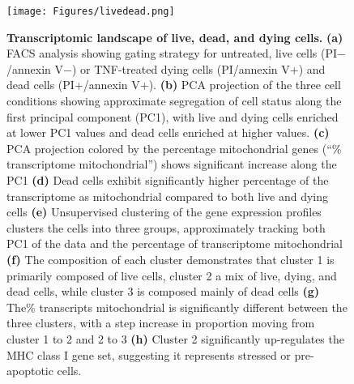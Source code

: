 \begin{figure}
	\centering
	\texttt{[image: Figures/livedead.png]}
	\caption[Transcriptomic landscape of live, dead, and dying cells.]
	{\small
	    \textbf{Transcriptomic landscape of live, dead, and dying cells.}
	    \textbf{(a)} FACS analysis showing gating strategy for untreated, live cells (PI$-$/annexin V$-$) or TNF\textalpha-treated dying cells (PI/annexin V+) and dead cells (PI+/annexin V+).
	    \textbf{(b)} PCA projection of the three cell conditions showing approximate segregation of cell status along the first principal component (PC1), with live and dying cells enriched at lower PC1 values and dead cells enriched at higher values.
	    \textbf{(c)} PCA projection colored by the percentage mitochondrial genes (``\% transcriptome mitochondrial'') shows significant increase along the PC1 \textbf{(d)} Dead cells exhibit significantly higher percentage of the transcriptome as mitochondrial compared to both live and dying cells \textbf{(e)} Unsupervised clustering of the gene expression profiles clusters the cells into three groups, approximately tracking both PC1 of the data and the percentage of transcriptome mitochondrial \textbf{(f)} The composition of each cluster demonstrates that cluster 1 is primarily composed of live cells, cluster 2 a mix of live, dying, and dead cells, while cluster 3 is composed mainly of dead cells \textbf{(g)} The\% transcripts mitochondrial is significantly different between the three clusters, with a step increase in proportion moving from cluster 1 to 2 and 2 to 3 \textbf{(h)} Cluster 2 significantly up-regulates the MHC class I gene set, suggesting it represents stressed or pre-apoptotic cells.
	}
	\label{fig:livedead}
\end{figure}


